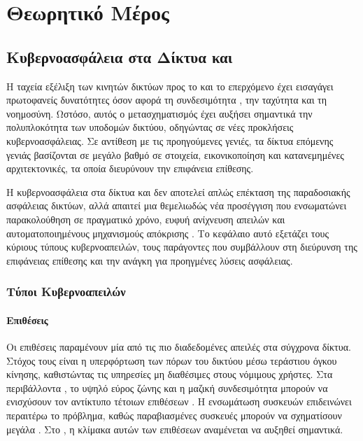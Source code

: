 \chapter{Θεωρητικό Μέρος}

\section{Κυβερνοασφάλεια στα Δίκτυα  και }


Η ταχεία εξέλιξη των κινητών δικτύων προς το  και το επερχόμενο  έχει εισαγάγει πρωτοφανείς δυνατότητες όσον αφορά τη συνδεσιμότητα
, την ταχύτητα και τη νοημοσύνη. Ωστόσο, αυτός ο μετασχηματισμός έχει αυξήσει σημαντικά την πολυπλοκότητα των υποδομών δικτύου, 
οδηγώντας σε νέες προκλήσεις κυβερνοασφάλειας. Σε αντίθεση με τις προηγούμενες γενιές, τα δίκτυα επόμενης γενιάς βασίζονται σε μεγάλο βαθμό
 σε  στοιχεία, εικονικοποίηση και κατανεμημένες αρχιτεκτονικές, τα οποία διευρύνουν την επιφάνεια επίθεσης.

Η κυβερνοασφάλεια στα δίκτυα  και  δεν αποτελεί απλώς επέκταση της παραδοσιακής ασφάλειας δικτύων, αλλά απαιτεί μια θεμελιωδώς νέα προσέγγιση 
που ενσωματώνει παρακολούθηση σε πραγματικό χρόνο, ευφυή ανίχνευση απειλών και αυτοματοποιημένους μηχανισμούς απόκρισης \cite{ferrag2019security}. 
Το κεφάλαιο αυτό εξετάζει τους κύριους τύπους κυβερνοαπειλών, τους παράγοντες που συμβάλλουν στη διεύρυνση της επιφάνειας επίθεσης και την ανάγκη για προηγμένες 
λύσεις ασφάλειας.

\subsection{Τύποι Κυβερνοαπειλών}

\subsubsection{Επιθέσεις }

Οι επιθέσεις  παραμένουν μία από τις πιο διαδεδομένες απειλές στα σύγχρονα δίκτυα. Στόχος τους είναι η υπερφόρτωση των πόρων του δικτύου μέσω τεράστιου όγκου κίνησης, καθιστώντας τις υπηρεσίες μη διαθέσιμες στους νόμιμους χρήστες. Στα περιβάλλοντα , το υψηλό εύρος ζώνης και η μαζική συνδεσιμότητα μπορούν να ενισχύσουν τον αντίκτυπο τέτοιων επιθέσεων \cite{zhang2019ddos}. Η ενσωμάτωση συσκευών  επιδεινώνει περαιτέρω το πρόβλημα, καθώς παραβιασμένες συσκευές μπορούν να σχηματίσουν μεγάλα . Στο , η κλίμακα αυτών των επιθέσεων αναμένεται να αυξηθεί σημαντικά.

